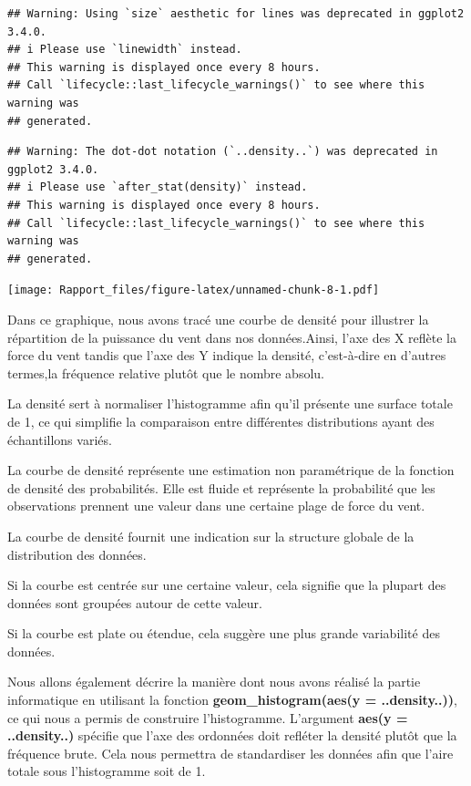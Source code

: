 \documentclass[
]{article}
\begin{document}
\begin{verbatim}
## Warning: Using `size` aesthetic for lines was deprecated in ggplot2 3.4.0.
## i Please use `linewidth` instead.
## This warning is displayed once every 8 hours.
## Call `lifecycle::last_lifecycle_warnings()` to see where this warning was
## generated.
\end{verbatim}

\begin{verbatim}
## Warning: The dot-dot notation (`..density..`) was deprecated in ggplot2 3.4.0.
## i Please use `after_stat(density)` instead.
## This warning is displayed once every 8 hours.
## Call `lifecycle::last_lifecycle_warnings()` to see where this warning was
## generated.
\end{verbatim}

\texttt{[image: Rapport\_files/figure-latex/unnamed-chunk-8-1.pdf]}

Dans ce graphique, nous avons tracé une courbe de densité pour illustrer
la répartition de la puissance du vent dans nos données.Ainsi, l'axe des
X reflète la force du vent tandis que l'axe des Y indique la densité,
c'est-à-dire en d'autres termes,la fréquence relative plutôt que le
nombre absolu.

La densité sert à normaliser l'histogramme afin qu'il présente une
surface totale de 1, ce qui simplifie la comparaison entre différentes
distributions ayant des échantillons variés.

La courbe de densité représente une estimation non paramétrique de la
fonction de densité des probabilités. Elle est fluide et représente la
probabilité que les observations prennent une valeur dans une certaine
plage de force du vent.

La courbe de densité fournit une indication sur la structure globale de
la distribution des données.

Si la courbe est centrée sur une certaine valeur, cela signifie que la
plupart des données sont groupées autour de cette valeur.

Si la courbe est plate ou étendue, cela suggère une plus grande
variabilité des données.

Nous allons également décrire la manière dont nous avons réalisé la
partie informatique en utilisant la fonction
\textbf{geom\_histogram(aes(y = ..density..))}, ce qui nous a permis de
construire l'histogramme. L'argument \textbf{aes(y = ..density..)}
spécifie que l'axe des ordonnées doit refléter la densité plutôt que la
fréquence brute. Cela nous permettra de standardiser les données afin
que l'aire totale sous l'histogramme soit de 1.
\end{document}

